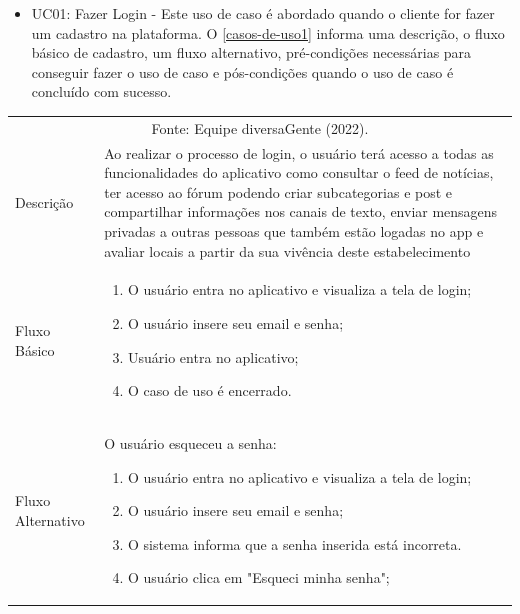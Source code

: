 \begin{apendicesenv}
	
	\begin{itemize}
		\item UC01: Fazer Login - Este uso de caso é abordado quando o cliente for fazer um cadastro na plataforma. O \autoref{casos-de-uso1} informa uma descrição, o fluxo básico de cadastro, um fluxo alternativo, pré-condições necessárias para conseguir fazer o uso de caso e pós-condições quando o uso de caso é concluído com sucesso.\\			
	\end{itemize}

\begin{quadro}[htb]
	\centering
	\ABNTEXfontereduzida
	\caption[Caso de Uso Fazer Login]{Caso de Uso Fazer Login}
	\label{casos-de-uso1}
\end{quadro}
\begin{longtable}{|p{3.3cm}|p{12.3cm}|}
	\hline
	\thead{} & \thead{Ator} \\
	\hline
	\endfirsthead
	\multicolumn{2}{c}{\scriptsize Fonte: Equipe diversaGente (2022).}%
	{{\bfseries \autoref{casos-de-uso1} continued from previous page}} \\
	\endhead
	Descrição & Ao realizar o processo de login, o usuário terá acesso a todas as funcionalidades do aplicativo como consultar o feed de notícias, ter acesso ao fórum podendo criar subcategorias e post e compartilhar informações nos canais de texto, enviar mensagens privadas a outras pessoas que também estão logadas no app e avaliar locais a partir da sua vivência deste estabelecimento \\
	\hline
	Fluxo Básico  & 
	\begin{enumerate}
		\item O usuário entra no aplicativo e visualiza a tela de login;
		\item O usuário insere seu email e senha;
		\item Usuário entra no aplicativo;
		\item O caso de uso é encerrado. 
	\end{enumerate}\\
	\hline
	Fluxo Alternativo  & O usuário esqueceu a senha:
	\begin{enumerate}
		\item O usuário entra no aplicativo e visualiza a tela de login;
		\item O usuário insere seu email e senha;
		\item O sistema informa que a senha inserida está incorreta.
		\item O usuário clica em "Esqueci minha senha";

\end{enumerate}
\end{longtable}
\end{apendicesenv}
